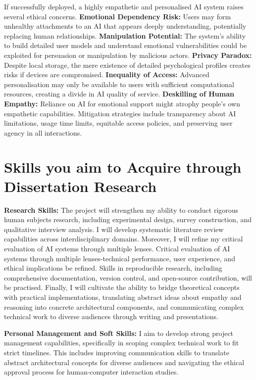 \documentclass[a4paper,oneside,12pt]{book}
\numberwithin{equation}{chapter} %
\begin{document}
If successfully deployed, a highly empathetic and personalised AI system raises several ethical concerns. \textbf{Emotional Dependency Risk:} Users may form unhealthy attachments to an AI that appears deeply understanding, potentially replacing human relationships. \textbf{Manipulation Potential:} The system's ability to build detailed user models and understand emotional vulnerabilities could be exploited for persuasion or manipulation by malicious actors. \textbf{Privacy Paradox:} Despite local storage, the mere existence of detailed psychological profiles creates risks if devices are compromised. \textbf{Inequality of Access:} Advanced personalisation may only be available to users with sufficient computational resources, creating a divide in AI quality of service. \textbf{Deskilling of Human Empathy:} Reliance on AI for emotional support might atrophy people's own empathetic capabilities. Mitigation strategies include transparency about AI limitations, usage time limits, equitable access policies, and preserving user agency in all interactions.

\section{Skills you aim to Acquire through Dissertation Research}

\textbf{Research Skills:} The project will strengthen my ability to conduct rigorous human subjects research, including experimental design, survey construction, and qualitative interview analysis. I will develop systematic literature review capabilities across interdisciplinary domains. Moreover, I will refine my critical evaluation of AI systems through multiple lenses. Critical evaluation of AI systems through multiple lenses-technical performance, user experience, and ethical implications be refined. Skills in reproducible research, including comprehensive documentation, version control, and open-source contribution, will be practised. Finally, I will cultivate the ability to bridge theoretical concepts with practical implementations, translating abstract ideas about empathy and reasoning into concrete architectural components, and communicating complex technical work to diverse audiences through writing and presentations.

\textbf{Personal Management and Soft Skills:} I aim to develop strong project management capabilities, specifically in scoping complex technical work to fit strict timelines. This includes improving communication skills to translate abstract architectural concepts for diverse audiences and navigating the ethical approval process for human-computer interaction studies.
\end{document}
